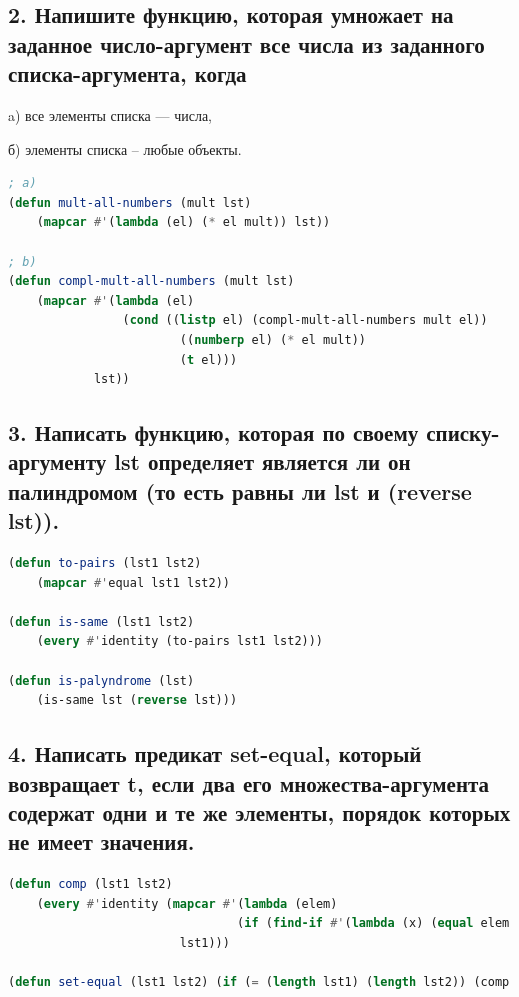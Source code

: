 \documentclass[12pt]{report}
\begin{document}
\subsection*{2. Напишите функцию, которая умножает на заданное число-аргумент все числа
	из заданного списка-аргумента, когда}

a) все элементы списка --- числа,

б) элементы списка -- любые объекты.

\begin{lstlisting}[label=6xd, caption=Решение задания №2, language=lisp]
; a)
(defun mult-all-numbers (mult lst)
	(mapcar #'(lambda (el) (* el mult)) lst))
	
; b)
(defun compl-mult-all-numbers (mult lst)
	(mapcar #'(lambda (el) 
				(cond ((listp el) (compl-mult-all-numbers mult el))
						((numberp el) (* el mult))
						(t el)))
			lst))

\end{lstlisting}

\subsection*{3. Написать функцию, которая по своему списку-аргументу lst определяет
	является ли он палиндромом (то есть равны ли lst и (reverse lst)).}

\begin{lstlisting}[label=6xd, caption=Решение задания №3, language=lisp]
(defun to-pairs (lst1 lst2)
	(mapcar #'equal lst1 lst2))

(defun is-same (lst1 lst2)
	(every #'identity (to-pairs lst1 lst2)))

(defun is-palyndrome (lst)
	(is-same lst (reverse lst)))

\end{lstlisting}

\subsection*{4. Написать предикат set-equal, который возвращает t, если два его множества-аргумента содержат одни и те же элементы, порядок которых не имеет значения.}

\begin{lstlisting}[label=6xd, caption=Решение задания №4, language=lisp]
(defun comp (lst1 lst2)
	(every #'identity (mapcar #'(lambda (elem)
								(if (find-if #'(lambda (x) (equal elem x)) lst2) T))
						lst1)))

(defun set-equal (lst1 lst2) (if (= (length lst1) (length lst2)) (comp lst1 lst2)))

\end{lstlisting}
\end{document}
